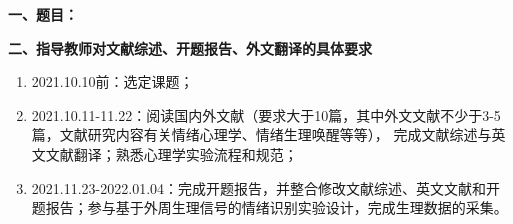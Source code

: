 {
    \setlength{\parindent}{0em}
    \par {\bfseries 一、题目：\Title}
    \\
    \par 
    {
        {
            \bfseries 
            二、指导教师对文献综述、开题报告、外文翻译的具体要求
        }
        ~\\
        {
            \fangsong
            \begin{enumerate}
                \item 2021.10.10前：选定课题；
                \item 2021.10.11-11.22：阅读国内外文献（要求大于10篇，其中外文文献不少于3-5篇，文献研究内容有关情绪心理学、情绪生理唤醒等等）， 完成文献综述与英文文献翻译；熟悉心理学实验流程和规范；
                \item 2021.11.23-2022.01.04：完成开题报告，并整合修改文献综述、英文文献和开题报告；参与基于外周生理信号的情绪识别实验设计，完成生理数据的采集。
                

            \end{enumerate}

        }
    }
}

\mbox{} \vfill

\signature{指导教师（签名）}
